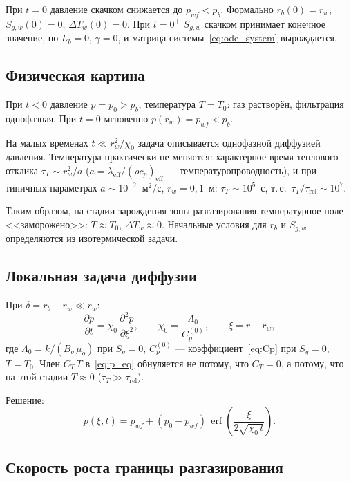 \documentclass[12pt,a4paper]{article}
\newcommand{\pp}{\partial}
\newcommand{\eff}{\mathrm{eff}}
\begin{document}
При $t = 0$ давление скачком снижается до $p_{wf} < p_b$.
Формально $r_b(0) = r_w$, $S_{g,w}(0) = 0$, $\Delta T_w(0) = 0$.
При $t = 0^+$ $S_{g,w}$ скачком принимает конечное
значение, но $L_b = 0$, $\gamma = 0$, и матрица
системы~\eqref{eq:ode_system} вырождается.

\subsection{Физическая картина}

При $t < 0$ давление $p = p_0 > p_b$, температура $T = T_0$:
газ растворён, фильтрация однофазная.
При $t = 0$ мгновенно $p(r_w) = p_{wf} < p_b$.

На малых временах $t \ll r_w^2/\chi_0$ задача описывается
однофазной диффузией давления. Температура практически
не меняется: характерное время теплового отклика
$\tau_T \sim r_w^2/a$ ($a = \lambda_\eff/(\rho c_p)_\eff$
--- температуропроводность), и при типичных параметрах
$a \sim 10^{-7}$~м$^2$/с, $r_w = 0{,}1$~м:
$\tau_T \sim 10^5$~с, т.\,е.\
$\tau_T/\tau_\mathrm{rel} \sim 10^7$.

Таким образом, на стадии зарождения зоны разгазирования
температурное поле <<заморожено>>: $T \approx T_0$,
$\Delta T_w \approx 0$. Начальные условия для $r_b$
и $S_{g,w}$ определяются из изотермической задачи.

\subsection{Локальная задача диффузии}

При $\delta = r_b - r_w \ll r_w$:
\begin{equation}\label{eq:diffusion}
  \frac{\pp p}{\pp t} = \chi_0\,\frac{\pp^2 p}{\pp \xi^2},
  \qquad
  \chi_0 = \frac{\Lambda_0}{C_p^{(0)}},
  \qquad
  \xi = r - r_w,
\end{equation}
где $\Lambda_0 = k/(B_g\,\mu_o)$ при $S_g = 0$,
$C_p^{(0)}$ --- коэффициент~\eqref{eq:Cp}
при $S_g = 0$, $T = T_0$.
Член $C_T\,\dot{T}$ в~\eqref{eq:p_eq} обнуляется не потому,
что $C_T = 0$, а потому, что на этой стадии $\dot{T} \approx 0$
($\tau_T \gg \tau_\mathrm{rel}$).

Решение:
\begin{equation}\label{eq:p_erfc}
  p(\xi, t) = p_{wf} + (p_0 - p_{wf})\,
    \operatorname{erf}\!\left(\frac{\xi}{2\sqrt{\chi_0\,t}}\right).
\end{equation}

\subsection{Скорость роста границы разгазирования}
\end{document}
